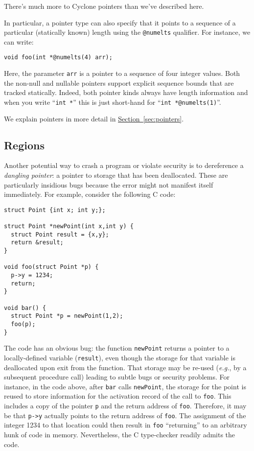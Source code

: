 There's much more to Cyclone pointers than we've described here.  

In particular, a pointer type can also specify that it points to a
sequence of a particular (statically known) length using the
\texttt{@numelts} qualifier.  For instance, we can write:
\begin{verbatim}
void foo(int *@numelts(4) arr);
\end{verbatim}
Here, the parameter \texttt{arr} is a pointer to a sequence of
four integer values.  Both the non-null and nullable pointers
support explicit sequence bounds that are tracked statically.
Indeed, both pointer kinds always have length information and
when you write ``\texttt{int *}'' this is just short-hand for
``\texttt{int *@numelts(1)}''.

We explain pointers in more detail in
\hyperref[{sec:pointers}]{Section~\ref{sec:pointers}}.

\subsection{Regions}

Another potential way to crash a program or violate security is
to dereference a \emph{dangling pointer}: a pointer to storage that
has been deallocated.  These are particularly insidious bugs
because the error might not manifest itself immediately.  
For example, consider the following C code:
\begin{verbatim}
struct Point {int x; int y;};

struct Point *newPoint(int x,int y) {
  struct Point result = {x,y};
  return &result;
}

void foo(struct Point *p) {
  p->y = 1234;
  return;
}

void bar() {
  struct Point *p = newPoint(1,2);
  foo(p);
}
\end{verbatim}
The code has an obvious bug: the function \texttt{newPoint} returns a
pointer to a locally-defined variable (\texttt{result}), even though
the storage for that variable is deallocated upon exit from the
function.  That storage may be re-used (\emph{e.g.}, by a subsequent procedure
call) leading to subtle bugs or security problems.  For instance, in
the code above, after \texttt{bar} calls \texttt{newPoint}, the storage
for the point is reused to store information for the activation
record of the call to \texttt{foo}.  This includes a copy of the
pointer \texttt{p} and the return address of \texttt{foo}.  Therefore,
it may be that \texttt{p->y} actually points to the return address of
\texttt{foo}. The assignment of the integer 1234 to that location could
then result in \texttt{foo} ``returning'' to an arbitrary hunk of code
in memory.  Nevertheless, the C type-checker readily
admits the code.

